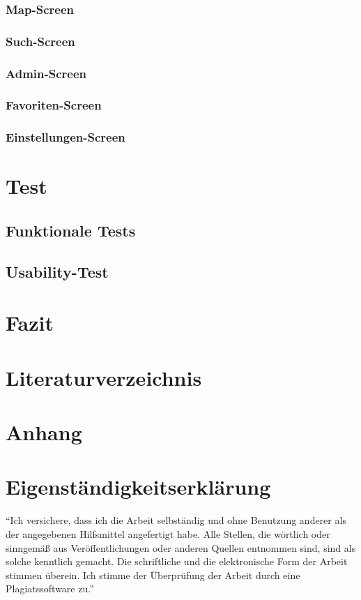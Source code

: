 \documentclass[12pt, a4paper, oneside]{article}
\begin{document}
\subsubsection{Map-Screen}
\subsubsection{Such-Screen}
\subsubsection{Admin-Screen}
\subsubsection{Favoriten-Screen}
\subsubsection{Einstellungen-Screen}

\section{Test}
\subsection{Funktionale Tests}
\subsection{Usability-Test}
\newpage

\section{Fazit}

\section{Literaturverzeichnis}

\renewcommand{\refname}{} 


\newpage


\appendix %
\section{Anhang}

\newpage

\section{Eigenständigkeitserklärung}
``Ich versichere, dass ich die Arbeit selbständig und ohne Benutzung anderer als der angegebenen Hilfsmittel angefertigt habe. Alle Stellen, die wörtlich oder sinngemäß aus Veröffentlichungen oder anderen Quellen entnommen sind, sind als solche kenntlich gemacht. Die schriftliche und die elektronische Form der Arbeit stimmen überein. Ich stimme der Überprüfung der Arbeit durch eine Plagiatssoftware zu.''
\end{document}
